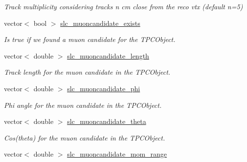\begin{DoxyCompactItemize}
\begin{DoxyCompactList}\small\item\em Track multiplicity considering tracks n cm close from the reco vtx (default n=5) \end{DoxyCompactList}\item 
\hypertarget{classUBXSecEvent_a77d7addc1e52f51c7697daab275c8bc6}{vector$<$ bool $>$ \hyperlink{classUBXSecEvent_a77d7addc1e52f51c7697daab275c8bc6}{slc\-\_\-muoncandidate\-\_\-exists}}\label{classUBXSecEvent_a77d7addc1e52f51c7697daab275c8bc6}

\begin{DoxyCompactList}\small\item\em Is true if we found a muon candidate for the T\-P\-C\-Object. \end{DoxyCompactList}\item 
\hypertarget{classUBXSecEvent_aed08b3fea158e50f1f878bb211e7abb6}{vector$<$ double $>$ \hyperlink{classUBXSecEvent_aed08b3fea158e50f1f878bb211e7abb6}{slc\-\_\-muoncandidate\-\_\-length}}\label{classUBXSecEvent_aed08b3fea158e50f1f878bb211e7abb6}

\begin{DoxyCompactList}\small\item\em Track length for the muon candidate in the T\-P\-C\-Object. \end{DoxyCompactList}\item 
\hypertarget{classUBXSecEvent_a99414e0a0e74aaeac78fa019f53f4760}{vector$<$ double $>$ \hyperlink{classUBXSecEvent_a99414e0a0e74aaeac78fa019f53f4760}{slc\-\_\-muoncandidate\-\_\-phi}}\label{classUBXSecEvent_a99414e0a0e74aaeac78fa019f53f4760}

\begin{DoxyCompactList}\small\item\em Phi angle for the muon candidate in the T\-P\-C\-Object. \end{DoxyCompactList}\item 
\hypertarget{classUBXSecEvent_a8b3d8a8475d7c283fad2d1d4e6a85dca}{vector$<$ double $>$ \hyperlink{classUBXSecEvent_a8b3d8a8475d7c283fad2d1d4e6a85dca}{slc\-\_\-muoncandidate\-\_\-theta}}\label{classUBXSecEvent_a8b3d8a8475d7c283fad2d1d4e6a85dca}

\begin{DoxyCompactList}\small\item\em Cos(theta) for the muon candidate in the T\-P\-C\-Object. \end{DoxyCompactList}\item 
\hypertarget{classUBXSecEvent_a80cdc2f0c0eaac347f9475e1e04ca68b}{vector$<$ double $>$ \hyperlink{classUBXSecEvent_a80cdc2f0c0eaac347f9475e1e04ca68b}{slc\-\_\-muoncandidate\-\_\-mom\-\_\-range}}\label{classUBXSecEvent_a80cdc2f0c0eaac347f9475e1e04ca68b}


\end{DoxyCompactItemize}

